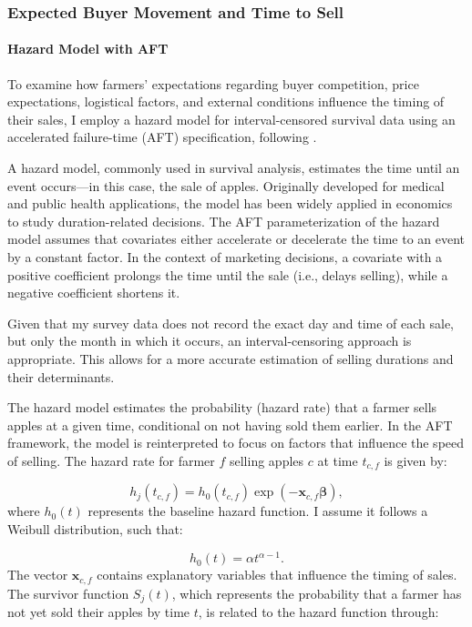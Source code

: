 \documentclass[12pt]{article}
\begin{document}
\newpage
\subsubsection{Expected Buyer Movement and Time to Sell}

\paragraph{Hazard Model with AFT}

To examine how farmers' expectations regarding buyer competition, price expectations, logistical factors, and external conditions influence the timing of their sales, I employ a hazard model for interval-censored survival data using an accelerated failure-time (AFT) specification, following \cite{albuquerque2024market}.  

A hazard model, commonly used in survival analysis, estimates the time until an event occurs—in this case, the sale of apples. Originally developed for medical and public health applications, the model has been widely applied in economics to study duration-related decisions. The AFT parameterization of the hazard model assumes that covariates either accelerate or decelerate the time to an event by a constant factor. In the context of marketing decisions, a covariate with a positive coefficient prolongs the time until the sale (i.e., delays selling), while a negative coefficient shortens it.  

Given that my survey data does not record the exact day and time of each sale, but only the month in which it occurs, an interval-censoring approach is appropriate. This allows for a more accurate estimation of selling durations and their determinants.  

The hazard model estimates the probability (hazard rate) that a farmer sells apples at a given time, conditional on not having sold them earlier. In the AFT framework, the model is reinterpreted to focus on factors that influence the speed of selling. The hazard rate for farmer $f$ selling apples $c$ at time $t_{c,f}$ is given by:  

\begin{equation}
    h_j(t_{c,f}) = h_0(t_{c,f}) \exp\left(-\mathbf{x}_{c,f} \boldsymbol{\beta}\right),
\end{equation}
where $h_0(t)$ represents the baseline hazard function. I assume it follows a Weibull distribution, such that:  

\begin{equation}
    h_0(t) = \alpha t^{\alpha-1}.
\end{equation}
The vector $\mathbf{x}_{c,f}$ contains explanatory variables that influence the timing of sales. The survivor function $S_j(t)$, which represents the probability that a farmer has not yet sold their apples by time $t$, is related to the hazard function through:  
\end{document}
